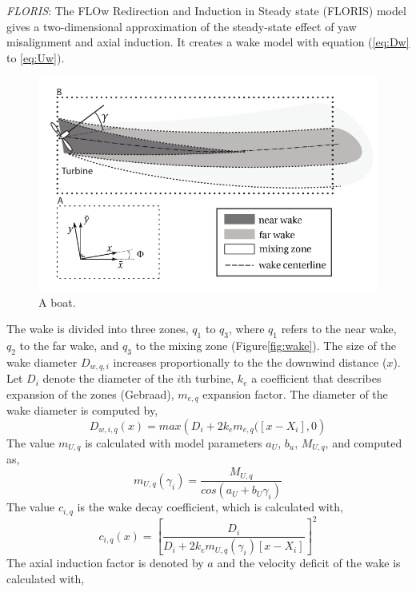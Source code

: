 \documentclass[twoside,twocolumn]{article}
\begin{document}
	\textit{FLORIS}: The FLOw Redirection and Induction in Steady state (FLORIS) model gives a two-dimensional approximation of the steady-state effect of yaw misalignment and axial induction. It creates a wake model with equation (\ref{eq:Dw} to \ref{eq:Uw}). 
\begin{figure}
\label{fig:wake}
  \includegraphics[width=\linewidth]{WakeFLORIS.png}
  \caption{A boat.}
  \label{fig:optim}
\end{figure}
The wake is divided into three zones, $q_1$ to $q_3$, where $q_1$ refers to the near wake, $q_2$ to the far wake, and $q_3$ to the mixing zone (Figure\ref{fig:wake}).
The size of the wake diameter $D_{w,q,i}$ increases proportionally to the the downwind distance ($x$). Let $D_i$ denote the diameter of the $i$th turbine, $k_e$ a coefficient that describes expansion of the zones (Gebraad), $m_{e,q}$ expansion factor. The diameter of the wake diameter is computed by,
\begin{equation}
\label{eq:Dw}
D_{w,i,q}(x) = max\left( {D_i + 2k_em_{e,q}([x - X_i],0} \right)
\end{equation}
The value $m_{U,q}$ is calculated with model parameters $a_U$, $b_u$, $M_{U,q}$, and computed as,
\begin{equation}
\label{eq:mU}
m_{U,q}(\gamma_i) =  \frac{M_{U,q}}{cos(a_U+b_U\gamma_i)}
\end{equation}
The value $c_{i,q}$ is the wake decay coefficient, which is calculated with,
\begin{equation}
\label{eq:c}
c_{i,q}(x) = \left[ \frac{D_i}{D_i + 2k_em_{U,q}(\gamma_i)[x - X_i]} \right]^2
\end{equation}
The axial induction factor is denoted by $a$ and the velocity deficit of the wake is calculated with,
\end{document}

